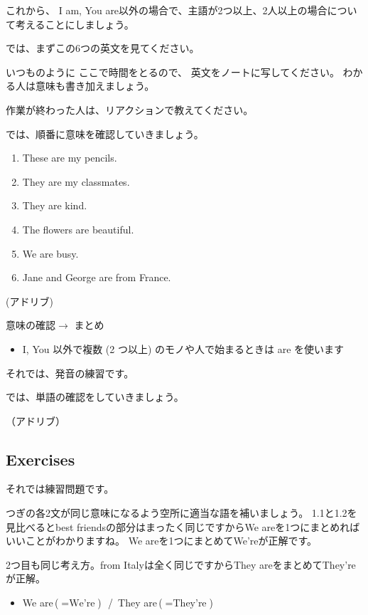 \documentclass[book,jafontscale=0.9247]{jlreq}
\newcommand{\mySagyo}{%
\begin{minipage}[t]{.98\textwidth}
\mbox{}\hrulefill\mbox{}\par%
\mbox{}\hfill{}\raisebox{-5pt}{作業}\hfill\mbox{}\par%
\mbox{}\hrulefill\mbox{}
\end{minipage}%
\par%
\bigskip
}
\begin{document}
これから、
I am, You are以外の場合で、主語が2つ以上、2人以上の場合について考えることにしましょう。


では、まずこの6つの英文を見てください。

いつものように
ここで時間をとるので、
英文をノートに写してください。
わかる人は意味も書き加えましょう。

作業が終わった人は、リアクションで教えてください。

\mySagyo

では、順番に意味を確認していきましょう。

\begin{enumerate}
 \item These are my pencils.
 \item They are my classmates.
 \item They are kind.
 \item The flowers are beautiful.
 \item We are busy.
 \item Jane and George are from France.
\end{enumerate}

(アドリブ)

意味の確認$\longrightarrow$\,\,まとめ

\begin{itemize}
 \item I, You 以外で複数 (2 つ以上) のモノや人で始まるときは are を使います
\end{itemize}


それでは、発音の練習です。

では、単語の確認をしていきましょう。

（アドリブ）

\subsection{Exercises}

それでは練習問題です。

つぎの各2文が同じ意味になるよう空所に適当な語を補いましょう。
1.1と1.2を見比べるとbest friendsの部分はまったく同じですからWe areを1つにまとめればいいことがわかりますね。
We areを1つにまとめてWe'reが正解です。

2つ目も同じ考え方。from Italyは全く同じですからThey areをまとめてThey'reが正解。

\begin{itemize}
 \item We are\,($=\text{We're}$)\,\,\,\,/\,\,\,They are\,($=\text{They're}$)
\end{itemize}
\end{document}
